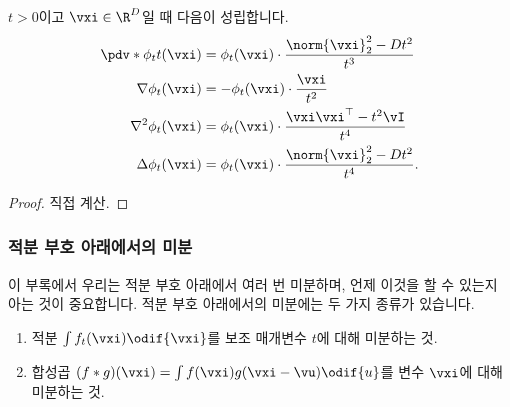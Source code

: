 \documentclass[../../book-main_ko.tex]{subfiles}
\begin{document}
\begin{proposition}\label{prop:normal_derivatives}
    \(t > 0\)이고 \(\vxi \in \R^{D}\)일 때 다음이 성립합니다.
    \begin{align}
        \pdv*{\phi_{t}}{t}(\vxi)
        &= \phi_{t}(\vxi) \cdot \frac{\norm{\vxi}_{2}^{2} - Dt^{2}}{t^{3}} \\
        \nabla \phi_{t}(\vxi)
        &= -\phi_{t}(\vxi)\cdot\frac{\vxi}{t^{2}} \\
        \nabla^{2} \phi_{t}(\vxi)
        &= \phi_{t}(\vxi)\cdot\frac{\vxi\vxi^{\top} - t^{2}\vI}{t^{4}} \\
        \Delta \phi_{t}(\vxi)
        &= \phi_{t}(\vxi) \cdot \frac{\norm{\vxi}_{2}^{2} - Dt^{2}}{t^{4}}.
    \end{align}
\end{proposition}
\begin{proof}
    직접 계산.
\end{proof}



\subsubsection{적분 부호 아래에서의 미분}

이 부록에서 우리는 적분 부호 아래에서 여러 번 미분하며, 언제 이것을 할 수 있는지 아는 것이 중요합니다. 적분 부호 아래에서의 미분에는 두 가지 종류가 있습니다.
\begin{enumerate}
    \item 적분 \(\int f_{t}(\vxi)\odif{\vxi}\)를 보조 매개변수 \(t\)에 대해 미분하는 것.
    \item 합성곱 \((f * g)(\vxi) = \int f(\vxi)g(\vxi - \vu)\odif{u}\)를 변수 \(\vxi\)에 대해 미분하는 것.
\end{enumerate}
\end{document}
